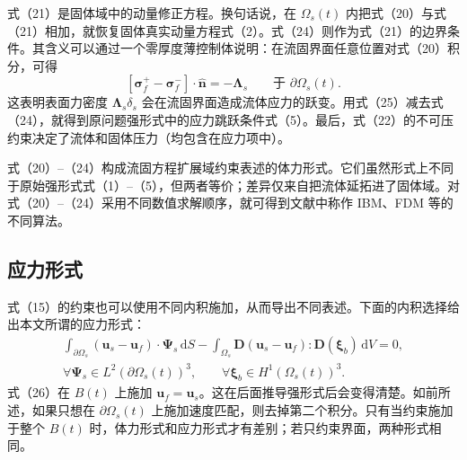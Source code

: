 \documentclass[UTF8,11pt,a4paper]{ctexart}
\newcommand{\dd}{\,\mathrm{d}}
\begin{document}
式（21）是固体域中的动量修正方程。换句话说，在 $\Omega_s(t)$ 内把式（20）与式（21）相加，就恢复固体真实动量方程式（2）。式（24）则作为式（21）的边界条件。其含义可以通过一个零厚度薄控制体说明：在流固界面任意位置对式（20）积分，可得
\begin{equation}
\left[\bm\sigma_f^{+}-\bm\sigma_f^{-}\right]\cdot\hat{\bm n}=-\bm\Lambda_s
\qquad\text{于 }\partial\Omega_s(t). \tag{25}
\end{equation}
这表明表面力密度 $\bm\Lambda_s\delta_s$ 会在流固界面造成流体应力的跃变。用式（25）减去式（24），就得到原问题强形式中的应力跳跃条件式（5）。最后，式（22）的不可压约束决定了流体和固体压力（均包含在应力项中）。

式（20）--（24）构成流固方程扩展域约束表述的体力形式。它们虽然形式上不同于原始强形式式（1）--（5），但两者等价；差异仅来自把流体延拓进了固体域。对式（20）--（24）采用不同数值求解顺序，就可得到文献中称作 IBM、FDM 等的不同算法。

\subsection{应力形式}

式（15）的约束也可以使用不同内积施加，从而导出不同表述。下面的内积选择给出本文所谓的应力形式：
\begin{align}
\int_{\partial\Omega_s}(\bm u_s-\bm u_f)\cdot\bm\Psi_s\dd S
-\int_{\Omega_s}\bm D(\bm u_s-\bm u_f):\bm D(\bm\xi_b)\dd V=0,\nonumber\\[-0.2em]
\forall\bm\Psi_s\in L^2(\partial\Omega_s(t))^3,\qquad \forall\bm\xi_b\in H^1(\Omega_s(t))^3. \tag{26}
\end{align}
式（26）在 $B(t)$ 上施加 $\bm u_f=\bm u_s$。这在后面推导强形式后会变得清楚。如前所述，如果只想在 $\partial\Omega_s(t)$ 上施加速度匹配，则去掉第二个积分。只有当约束施加于整个 $B(t)$ 时，体力形式和应力形式才有差别；若只约束界面，两种形式相同。
\end{document}
